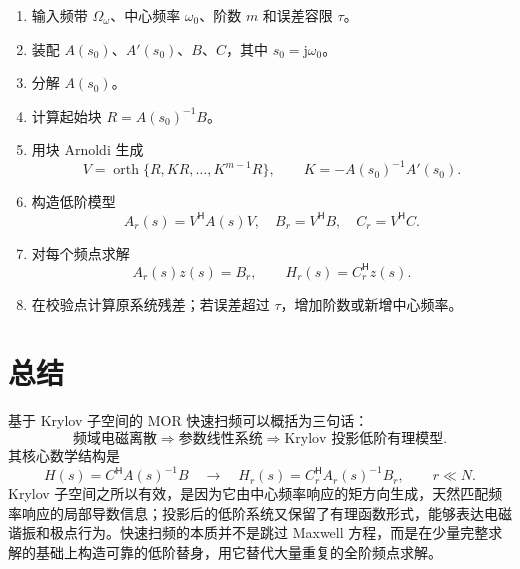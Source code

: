 \documentclass[UTF8,a4paper,11pt]{ctexart}
\newcommand{\jj}{\mathrm{j}}
\newcommand{\herm}{\mathsf{H}}
\begin{document}
\begin{enumerate}
    \item 输入频带 $\Omega_\omega$、中心频率 $\omega_0$、阶数 $m$ 和误差容限 $\tau$。
    \item 装配 $A(s_0)$、$A'(s_0)$、$B$、$C$，其中 $s_0=\jj\omega_0$。
    \item 分解 $A(s_0)$。
    \item 计算起始块 $R=A(s_0)^{-1}B$。
    \item 用块 Arnoldi 生成
    \[
        V=\operatorname{orth}\{R,KR,\ldots,K^{m-1}R\},
        \qquad K=-A(s_0)^{-1}A'(s_0).
    \]
    \item 构造低阶模型
    \[
        A_r(s)=V^{\herm}A(s)V,\quad
        B_r=V^{\herm}B,\quad
        C_r=V^{\herm}C .
    \]
    \item 对每个频点求解
    \[
        A_r(s)z(s)=B_r,\qquad
        H_r(s)=C_r^{\herm}z(s).
    \]
    \item 在校验点计算原系统残差；若误差超过 $\tau$，增加阶数或新增中心频率。
\end{enumerate}

\section{总结}

基于 Krylov 子空间的 MOR 快速扫频可以概括为三句话：
\[
    \text{频域电磁离散}
    \Rightarrow
    \text{参数线性系统}
    \Rightarrow
    \text{Krylov 投影低阶有理模型}.
\]
其核心数学结构是
\[
    H(s)=C^{\herm}A(s)^{-1}B
    \quad\longrightarrow\quad
    H_r(s)=C_r^{\herm}A_r(s)^{-1}B_r,
    \qquad r\ll N .
\]
Krylov 子空间之所以有效，是因为它由中心频率响应的矩方向生成，天然匹配频率响应的局部导数信息；投影后的低阶系统又保留了有理函数形式，能够表达电磁谐振和极点行为。快速扫频的本质并不是跳过 Maxwell 方程，而是在少量完整求解的基础上构造可靠的低阶替身，用它替代大量重复的全阶频点求解。
\end{document}
